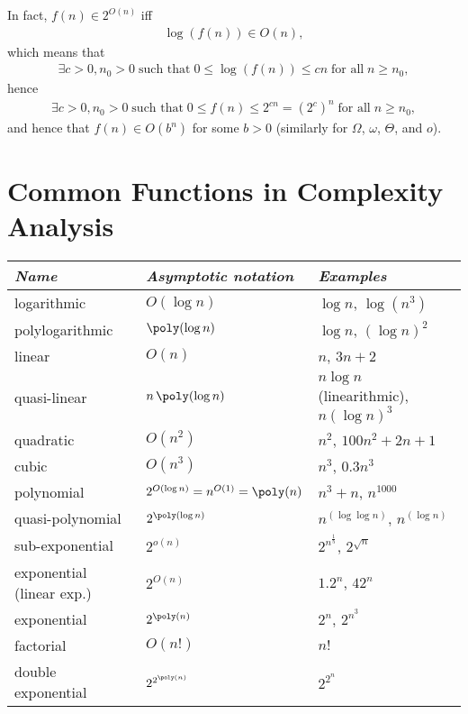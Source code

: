 \documentclass[a4paper]{report}
\theoremstyle{definition}
\begin{document}
In fact, $f(n) \in 2^{O(n)}$ iff
%
\begin{align*}
  \log(f(n)) \in O(n),
\end{align*}
%
which means that
%
\begin{align*}
  \exists c > 0, n_0 > 0 \;\text{such that}\; 0 \leq \log(f(n)) \leq cn \;\text{for all}\; n \geq n_0,
\end{align*}
%
hence
%
\begin{align*}
  \exists c > 0, n_0 > 0 \;\text{such that}\; 0 \leq f(n) \leq 2^{cn} = (2^c)^n \;\text{for all}\; n \geq n_0,
\end{align*}
%
and hence that $f(n) \in O(b^n)$ for some $b > 0$ (similarly for $\Omega$, $\omega$, $\Theta$, and $o$).

\section{Common Functions in Complexity Analysis}

\begin{tabular}{L{0.25\textwidth}L{0.3\textwidth}L{0.365\textwidth}}
  \toprule
  {\em Name} & {\em Asymptotic notation} & {\em Examples} \\

  \midrule

  logarithmic & $O(\log n)$ & $\log n$, $\log (n^3)$  \\

  polylogarithmic & $\poly(\log n)$ & $\log n$, $(\log n)^2$ \\

  linear & $O(n)$ & $n$, $3n + 2$ \\

  quasi-linear & $n \, \poly(\log n)$ & $n \log n$ (linearithmic), $n (\log n)^3$ \\
                 
  quadratic & $O(n^2)$ & $n^2$, $100 n^2 + 2n + 1$ \\

  cubic & $O(n^3)$ & $n^3$, $0.3 n^3$ \\
                
  polynomial & $2^{O(\log n)} = n^{O(1)} = \poly(n)$ & $n^3 + n$, $n^{1000}$ \\

  quasi-polynomial & $2^{\poly(\log n)}$ & $n^{(\log \log n)}$, $n^{(\log n)}$ \\

  sub-exponential & $2^{o(n)}$ & $2^{n^\frac{1}{5}}$, $2^{\sqrt{n}}$ \\
  
  exponential (linear exp.)& $2^{O(n)}$ & $1.2^n$, $42^n$ \\

  exponential & $2^{\poly(n)}$ & $2^n$, $2^{n^3}$ \\

  factorial & $O(n!)$ & $n!$ \\

  double exponential & $2^{2^{\poly(n)}}$ & $2^{2^{n}}$ \\
  \bottomrule
\end{tabular}
\end{document}
